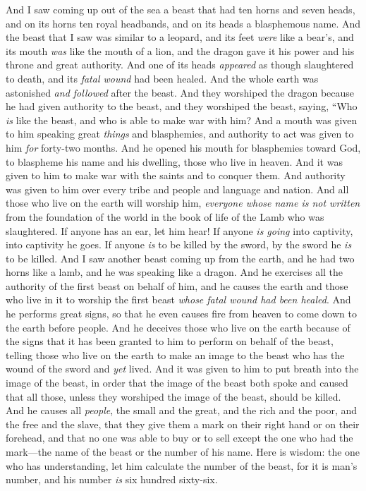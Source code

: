 \begin{biblechapter} %
 And I saw coming up out of the sea a beast that had ten horns and seven heads, and on its horns ten royal headbands, and on its heads a blasphemous name.
\verse And the beast that I saw was similar to a leopard, and its feet \textit{were} like a bear’s, and its mouth \textit{was} like the mouth of a lion, and the dragon gave it his power and his throne and great authority.
\verse And one of its heads \textit{appeared} as though slaughtered to death, and its \textit{fatal wound} had been healed. And the whole earth was astonished \textit{and followed} after the beast.
\verse And they worshiped the dragon because he had given authority to the beast, and they worshiped the beast, saying, “Who \textit{is} like the beast, and who is able to make war with him?
\verse And a mouth was given to him speaking great \textit{things} and blasphemies, and authority to act was given to him \textit{for} forty-two months.
\verse And he opened his mouth for blasphemies toward God, to blaspheme his name and his dwelling, those who live in heaven.
\verse And it was given to him to make war with the saints and to conquer them. And authority was given to him over every tribe and people and language and nation.
\verse And all those who live on the earth will worship him, \textit{everyone whose name is not written} from the foundation of the world in the book of life of the Lamb who was slaughtered.
\verse If anyone has an ear, let him hear!
\verse If anyone \textit{is going} into captivity, into captivity he goes. 
If anyone \textit{is} to be killed by the sword, by the sword he \textit{is} to be killed.
 And I saw another beast coming up from the earth, and he had two horns like a lamb, and he was speaking like a dragon.
\verse And he exercises all the authority of the first beast on behalf of him, and he causes the earth and those who live in it to worship the first beast \textit{whose fatal wound had been healed}.
\verse And he performs great signs, so that he even causes fire from heaven to come down to the earth before people.
\verse And he deceives those who live on the earth because of the signs that it has been granted to him to perform on behalf of the beast, telling those who live on the earth to make an image to the beast who has the wound of the sword and \textit{yet} lived.
\verse And it was given to him to put breath into the image of the beast, in order that the image of the beast both spoke and caused that all those, unless they worshiped the image of the beast, should be killed.
\verse And he causes all \textit{people}, the small and the great, and the rich and the poor, and the free and the slave, that they give them a mark on their right hand or on their forehead,
\verse and that no one was able to buy or to sell except the one who had the mark—the name of the beast or the number of his name.
\verse Here is wisdom: the one who has understanding, let him calculate the number of the beast, for it is man’s number, and his number \textit{is} six hundred sixty-six.
\end{biblechapter}

